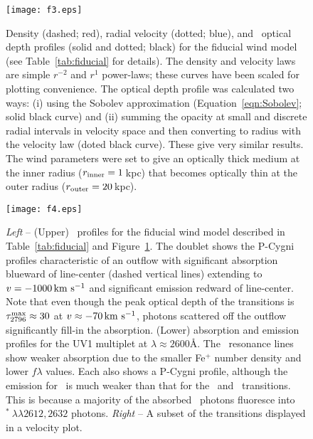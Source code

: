 \documentclass[12pt,preprint]{aastex}
\begin{document}
\begin{figure}
\texttt{[image: f3.eps]}
\caption{
Density (dashed; red), radial velocity (dotted; blue), and
\mgiia\ optical depth profiles (solid and dotted; black) for the fiducial
wind model (see Table~\ref{tab:fiducial} for details).
The density and velocity laws are simple $r^{-2}$ and $r^1$
power-laws; these curves have been scaled for plotting
convenience.  
The optical depth profile was calculated two ways: (i) using the
Sobolev approximation (Equation~\ref{eqn:Sobolev}; solid black curve)
and (ii) summing
the opacity at small and discrete radial intervals in velocity space
and then converting to radius with the velocity law (doted black
curve).  These give
very similar results. 
The wind parameters were set to give an optically thick medium at the
inner radius ($r_{\rm inner} = 1$\,kpc) that becomes optically thin at
the outer radius ($r_{\rm outer} = 20$\,kpc). 
}
\label{fig:fiducial_nvt}
\end{figure}

\begin{figure}
\texttt{[image: f4.eps]}
\caption{
{\it Left} -- (Upper) \mgiid\ profiles for the fiducial wind model
described in Table~\ref{tab:fiducial} and
Figure~\ref{fig:fiducial_nvt}.  The doublet shows the P-Cygni profiles
characteristic of an outflow with significant absorption blueward of
line-center (dashed vertical lines) extending to $v = -1000\, {\rm km~s^{-1}}$
and significant emission redward of line-center.  Note
that even though the peak optical depth of the  transitions
is $\tau_{2796}^{\rm max} \approx 30$ at $v \approx -70 \, {\rm km~s^{-1}}$,
photons scattered off the outflow significantly fill-in the absorption.
(Lower)  absorption and emission profiles for the UV1
multiplet at $\lambda \approx 2600$\AA.  The \feiid\ resonance lines 
show weaker absorption due to the smaller Fe$^+$ number density and
lower $f\lambda$ values.  Each also shows a P-Cygni profile, although
the emission for \feiia\ is much weaker than that for the
\feiib\ and \mgiid\ transitions.  This is because a majority of the
absorbed \feiia\ photons fluoresce into
$^*~\lambda\lambda 2612, 2632$ photons.
{\it Right} -- A subset of the transitions displayed in a velocity
plot.
}
\label{fig:fiducial_1d}
\end{figure}
\end{document}
